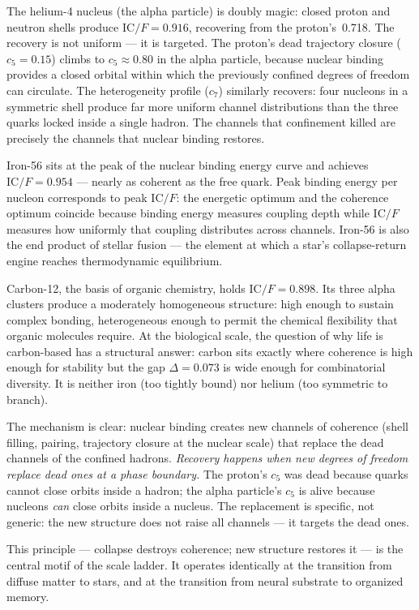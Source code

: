\documentclass[
  aps,
  prd,
  twocolumn,
  superscriptaddress,
  nofootinbib,
  floatfix
]{revtex4-2}
\newcommand{\IC}{\mathrm{IC}}
\begin{document}
The helium-4 nucleus (the alpha particle) is doubly magic:
closed proton and neutron shells produce $\IC/F = 0.916$,
recovering from the proton's~0.718.  The recovery is not
uniform --- it is targeted.  The proton's dead trajectory
closure ($c_5 = 0.15$) climbs to $c_5 \approx 0.80$ in the
alpha particle, because nuclear binding provides a closed
orbital within which the previously confined degrees of
freedom can circulate.  The heterogeneity profile ($c_7$)
similarly recovers: four nucleons in a symmetric shell
produce far more uniform channel distributions than the
three quarks locked inside a single hadron.  The channels
that confinement killed are precisely the channels that
nuclear binding restores.

Iron-56 sits at the peak of the nuclear binding energy
curve and achieves $\IC/F = 0.954$ --- nearly as coherent
as the free quark.   Peak binding energy per nucleon
corresponds to peak $\IC/F$: the energetic optimum and
the coherence optimum coincide because binding energy
measures coupling depth while $\IC/F$ measures how
uniformly that coupling distributes across channels.
Iron-56 is also the end product of stellar
fusion --- the element at which a star's collapse-return
engine reaches thermodynamic equilibrium.

Carbon-12, the basis of organic chemistry, holds
$\IC/F = 0.898$.  Its three alpha clusters produce a
moderately homogeneous structure: high enough to sustain
complex bonding, heterogeneous enough to permit the
chemical flexibility that organic molecules require.
At the biological scale, the question of why life is
carbon-based has a structural answer:
carbon sits exactly where coherence is high enough for
stability but the gap $\Delta = 0.073$ is wide enough
for combinatorial diversity.  It is neither iron (too
tightly bound) nor helium (too symmetric to branch).

The mechanism is clear: nuclear binding creates new channels
of coherence (shell filling, pairing, trajectory closure at
the nuclear scale) that replace the dead channels of the
confined hadrons.  \emph{Recovery happens when new degrees of
freedom replace dead ones at a phase boundary.}  The proton's
$c_5$ was dead because quarks cannot close orbits inside a
hadron; the alpha particle's $c_5$ is alive because nucleons
\emph{can} close orbits inside a nucleus.  The replacement
is specific, not generic: the new structure does not raise
all channels --- it targets the dead ones.

This principle --- collapse destroys coherence;
new structure restores it --- is the central motif of the
scale ladder.  It operates identically at the transition from
diffuse matter to stars, and at the transition from neural
substrate to organized memory.
\end{document}
